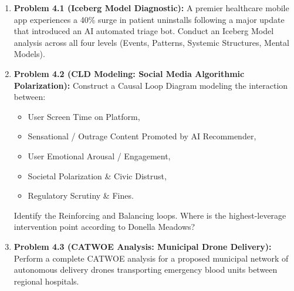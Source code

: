 \begin{enumerate}[leftmargin=2em]
    \item \textbf{Problem 4.1 (Iceberg Model Diagnostic):}
    A premier healthcare mobile app experiences a 40\% surge in patient uninstalls following a major update that introduced an AI automated triage bot. Conduct an Iceberg Model analysis across all four levels (Events, Patterns, Systemic Structures, Mental Models).
    
    \item \textbf{Problem 4.2 (CLD Modeling: Social Media Algorithmic Polarization):}
    Construct a Causal Loop Diagram modeling the interaction between:
    \begin{itemize}
        \item User Screen Time on Platform,
        \item Sensational / Outrage Content Promoted by AI Recommender,
        \item User Emotional Arousal / Engagement,
        \item Societal Polarization \& Civic Distrust,
        \item Regulatory Scrutiny \& Fines.
    \end{itemize}
    Identify the Reinforcing and Balancing loops. Where is the highest-leverage intervention point according to Donella Meadows?

    \item \textbf{Problem 4.3 (CATWOE Analysis: Municipal Drone Delivery):}
    Perform a complete CATWOE analysis for a proposed municipal network of autonomous delivery drones transporting emergency blood units between regional hospitals.
\end{enumerate}
